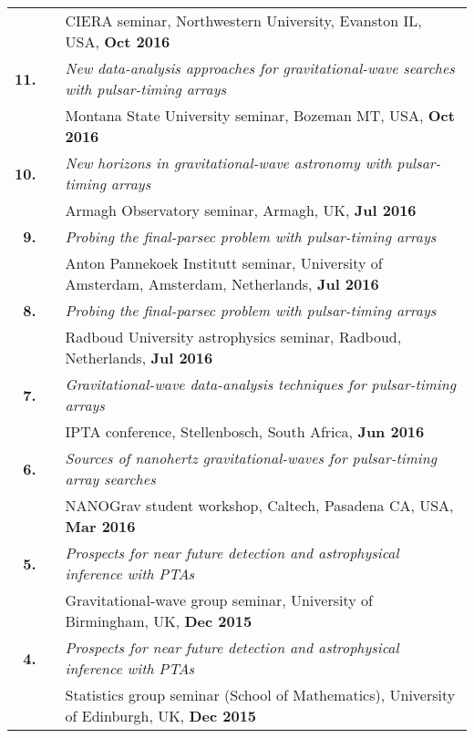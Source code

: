 \documentclass[11pt,letterpaper,sans]{moderncv}
\begin{document}
{\begin{longtable}{rp{0.3cm}p{15.8cm}}
&& CIERA seminar, Northwestern University, Evanston IL, USA, \textbf{Oct 2016} \vspace{0.09cm}\\
\textbf{11.} & & \textit{New data-analysis approaches for gravitational-wave searches with pulsar-timing arrays} \\ 
&& Montana State University seminar, Bozeman MT, USA, \textbf{Oct 2016} \vspace{0.09cm}\\
\textbf{10.} & & \textit{New horizons in gravitational-wave astronomy with pulsar-timing arrays} \\ 
&& Armagh Observatory seminar, Armagh, UK, \textbf{Jul 2016} \vspace{0.09cm}\\
\textbf{9.} & & \textit{Probing the final-parsec problem with pulsar-timing arrays} \\ 
&& Anton Pannekoek Institutt seminar, University of Amsterdam, Amsterdam, Netherlands, \textbf{Jul 2016} \vspace{0.09cm}\\
\textbf{8.} & & \textit{Probing the final-parsec problem with pulsar-timing arrays} \\ 
&& Radboud University astrophysics seminar, Radboud, Netherlands, \textbf{Jul 2016} \vspace{0.09cm}\\
\textbf{7.} & & \textit{Gravitational-wave data-analysis techniques for pulsar-timing arrays} \\ 
&& IPTA conference, Stellenbosch, South Africa, \textbf{Jun 2016} \vspace{0.09cm}\\
\textbf{6.} & & \textit{Sources of nanohertz gravitational-waves for pulsar-timing array searches} \\ 
&& NANOGrav student workshop, Caltech, Pasadena CA, USA, \textbf{Mar 2016} \vspace{0.09cm}\\
\textbf{5.} & & \textit{Prospects for near future detection and astrophysical inference with PTAs} \\ 
&& Gravitational-wave group seminar, University of Birmingham, UK, \textbf{Dec 2015} \vspace{0.09cm}\\
\textbf{4.} & & \textit{Prospects for near future detection and astrophysical inference with PTAs} \\ 
&& Statistics group seminar (School of Mathematics), University of Edinburgh, UK, \textbf{Dec 2015} \vspace{0.09cm}\\

\end{longtable}}
\end{document}
